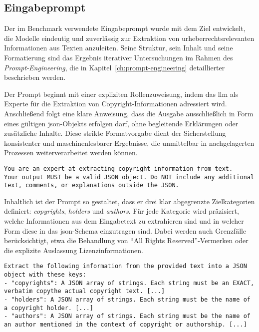 
\subsection{Eingabeprompt}\label{subsec:eingabeprompt}

Der im Benchmark verwendete Eingabeprompt wurde mit dem Ziel entwickelt, die Modelle eindeutig und zuverlässig zur Extraktion von urheberrechtsrelevanten Informationen aus Texten anzuleiten.
Seine Struktur, sein Inhalt und seine Formatierung sind das Ergebnis iterativer Untersuchungen im Rahmen des \textit{Prompt-Engineering}, die in Kapitel~\ref{ch:prompt-engineering} detaillierter beschrieben werden.

Der Prompt beginnt mit einer expliziten Rollenzuweisung, indem das \gls{llm} als Experte für die Extraktion von Copyright-Informationen adressiert wird.
Anschließend folgt eine klare Anweisung, dass die Ausgabe ausschließlich in Form eines gültigen \gls{json}-Objekts erfolgen darf, ohne begleitende Erklärungen oder zusätzliche Inhalte.
Diese strikte Formatvorgabe dient der Sicherstellung konsistenter und maschinenlesbarer Ergebnisse, die unmittelbar in nachgelagerten Prozessen weiterverarbeitet werden können.

\begin{lstlisting}[keepspaces=true]
You are an expert at extracting copyright information from text.
Your output MUST be a valid JSON object. Do NOT include any additional text, comments, or explanations outside the JSON.
\end{lstlisting}

Inhaltlich ist der Prompt so gestaltet, dass er drei klar abgegrenzte Zielkategorien definiert: \textit{copyrights}, \textit{holders} und \textit{authors}.
Für jede Kategorie wird präzisiert, welche Informationen aus dem Eingabetext zu extrahieren sind und in welcher Form diese in das \gls{json}-Schema einzutragen sind.
Dabei werden auch Grenzfälle berücksichtigt, etwa die Behandlung von \enquote{All Rights Reserved}-Vermerken oder die explizite Auslassung Lizenzinformationen.

\begin{lstlisting}[keepspaces=true]
Extract the following information from the provided text into a JSON object with these keys:
- "copyrights": A JSON array of strings. Each string must be an EXACT, verbatim copythe actual copyright text. [...]
- "holders": A JSON array of strings. Each string must be the name of a copyright holder. [...]
- "authors": A JSON array of strings. Each string must be the name of an author mentioned in the context of copyright or authorship. [...]
\end{lstlisting}

